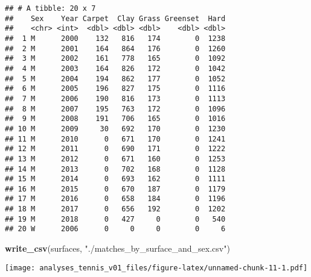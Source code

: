 \documentclass[]{article}
\newenvironment{Shaded}{\begin{snugshade}}{\end{snugshade}}
\newcommand{\DataTypeTok}[1]{\textcolor[rgb]{0.13,0.29,0.53}{#1}}
\newcommand{\DecValTok}[1]{\textcolor[rgb]{0.00,0.00,0.81}{#1}}
\newcommand{\KeywordTok}[1]{\textcolor[rgb]{0.13,0.29,0.53}{\textbf{#1}}}
\newcommand{\NormalTok}[1]{#1}
\newcommand{\OperatorTok}[1]{\textcolor[rgb]{0.81,0.36,0.00}{\textbf{#1}}}
\newcommand{\StringTok}[1]{\textcolor[rgb]{0.31,0.60,0.02}{#1}}
\begin{document}
\begin{verbatim}
## # A tibble: 20 x 7
##    Sex    Year Carpet  Clay Grass Greenset  Hard
##    <chr> <int>  <dbl> <dbl> <dbl>    <dbl> <dbl>
##  1 M      2000    132   816   174        0  1238
##  2 M      2001    164   864   176        0  1260
##  3 M      2002    161   778   165        0  1092
##  4 M      2003    164   826   172        0  1042
##  5 M      2004    194   862   177        0  1052
##  6 M      2005    196   827   175        0  1116
##  7 M      2006    190   816   173        0  1113
##  8 M      2007    195   763   172        0  1096
##  9 M      2008    191   706   165        0  1016
## 10 M      2009     30   692   170        0  1230
## 11 M      2010      0   671   170        0  1241
## 12 M      2011      0   690   171        0  1222
## 13 M      2012      0   671   160        0  1253
## 14 M      2013      0   702   168        0  1128
## 15 M      2014      0   693   162        0  1111
## 16 M      2015      0   670   187        0  1179
## 17 M      2016      0   658   184        0  1196
## 18 M      2017      0   656   192        0  1202
## 19 M      2018      0   427     0        0   540
## 20 W      2006      0     0     0        0     6
\end{verbatim}

\begin{Shaded}
\begin{Highlighting}[]
\KeywordTok{write_csv}\NormalTok{(surfaces, }\StringTok{"./matches_by_surface_and_sex.csv"}\NormalTok{)}
\end{Highlighting}
\end{Shaded}

\begin{Shaded}
\end{Shaded}

\texttt{[image: analyses\_tennis\_v01\_files/figure-latex/unnamed-chunk-11-1.pdf]}
\end{document}

